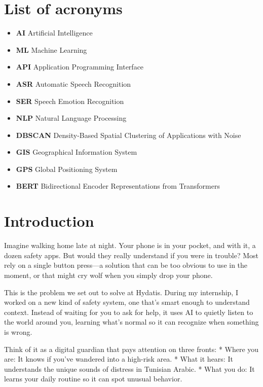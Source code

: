 \documentclass[12pt,a4paper,oneside,english]{book}
\begin{document}
\chapter*{List of acronyms}
\begin{itemize}
\item \textbf{AI} Artificial Intelligence
\item \textbf{ML} Machine Learning
\item \textbf{API} Application Programming Interface
\item \textbf{ASR} Automatic Speech Recognition
\item \textbf{SER} Speech Emotion Recognition
\item  \textbf{NLP} Natural Language Processing
\item \textbf{DBSCAN} Density-Based Spatial Clustering of Applications with Noise
\item \textbf{GIS} Geographical Information System
\item \textbf{GPS} Global Positioning System
\item \textbf{BERT} Bidirectional Encoder Representations from Transformers
\end{itemize}

\frontmatter %

\chapter*{Introduction}

Imagine walking home late at night. Your phone is in your pocket, and with it, a dozen safety apps. But would they really understand if you were in trouble? Most rely on a single button press—a solution that can be too obvious to use in the moment, or that might cry wolf when you simply drop your phone.

This is the problem we set out to solve at Hydatis. During my internship, I worked on a new kind of safety system, one that's smart enough to understand context. Instead of waiting for you to ask for help, it uses AI to quietly listen to the world around you, learning what's normal so it can recognize when something is wrong.

Think of it as a digital guardian that pays attention on three fronts:
*   Where you are: It knows if you've wandered into a high-risk area.
*   What it hears: It understands the unique sounds of distress in Tunisian Arabic.
*   What you do: It learns your daily routine so it can spot unusual behavior.
\end{document}
